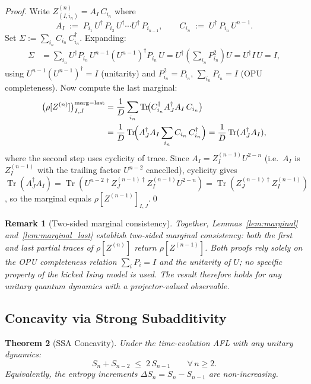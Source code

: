 \documentclass[12pt,a4paper]{article}
\newtheorem{theorem}{Theorem}[section]
\newtheorem{remark}[theorem]{Remark}
\begin{document}
\begin{proof}
Write $Z^{(n)}_{(I,i_n)} = A_I\,C_{i_n}$ where
\[
  A_I \;:=\; P_{i_1}\,U^\dagger\,P_{i_2}\,U^\dagger\cdots U^\dagger\,P_{i_{n-1}},
  \qquad
  C_{i_n} \;:=\; U^\dagger\,P_{i_n}\,U^{n-1}.
\]
Set $\Sigma := \sum_{i_n} C_{i_n}\,C_{i_n}^\dagger$.  Expanding:
\begin{align}
  \Sigma &= \sum_{i_n} U^\dagger P_{i_n}\,U^{n-1}(U^{n-1})^\dagger P_{i_n}\,U
           = U^\dagger\!\left(\sum_{i_n} P_{i_n}^2\right)U = U^\dagger I\,U = I,
\end{align}
using $U^{n-1}(U^{n-1})^\dagger = I$ (unitarity) and $P_{i_n}^2=P_{i_n}$,
$\sum_{i_n}P_{i_n}=I$ (OPU completeness).  Now compute the last marginal:
\begin{align}
  \bigl(\rho[Z^{(n)}]\bigr)^\mathrm{marg-last}_{I,J}
  &= \frac{1}{D}\sum_{i_n}
     \operatorname{Tr}\!\bigl(C_{i_n}^\dagger A_J^\dagger A_I\,C_{i_n}\bigr)
     \notag\\
  &= \frac{1}{D}\operatorname{Tr}\!\Bigl(A_J^\dagger A_I
     \sum_{i_n}C_{i_n}\,C_{i_n}^\dagger\Bigr)
   = \frac{1}{D}\operatorname{Tr}(A_J^\dagger A_I),
\end{align}
where the second step uses cyclicity of trace.  Since $A_I = Z^{(n-1)}_I U^{2-n}$
(i.e.\ $A_I$ is $Z^{(n-1)}_I$ with the trailing factor $U^{n-2}$ cancelled),
cyclicity gives
$\operatorname{Tr}(A_J^\dagger A_I)
 = \operatorname{Tr}(U^{n-2\,\dagger} Z^{(n-1)\dagger}_J Z^{(n-1)}_I U^{2-n})
 = \operatorname{Tr}(Z^{(n-1)\dagger}_J Z^{(n-1)}_I)$,
so the marginal equals $\rho[Z^{(n-1)}]_{I,J}$.\qed
\end{proof}

\begin{remark}[Two-sided marginal consistency]
Together, Lemmas~\ref{lem:marginal} and~\ref{lem:marginal_last} establish
\emph{two-sided marginal consistency}: both the first and last partial traces of
$\rho[Z^{(n)}]$ return $\rho[Z^{(n-1)}]$.  Both proofs rely solely on the OPU
completeness relation $\sum_i P_i = I$ and the unitarity of $U$; no specific
property of the kicked Ising model is used.  The result therefore holds for any
unitary quantum dynamics with a projector-valued observable.
\end{remark}

\subsection{Concavity via Strong Subadditivity}

\begin{theorem}[SSA Concavity]\label{thm:ssa_concave}
Under the time-evolution AFL with any unitary dynamics:
\begin{equation}\label{eq:concavity}
  S_n + S_{n-2} \;\le\; 2\,S_{n-1} \qquad \forall\,n\ge 2.
\end{equation}
Equivalently, the entropy increments $\Delta S_n = S_n - S_{n-1}$ are non-increasing.
\end{theorem}
\end{document}
